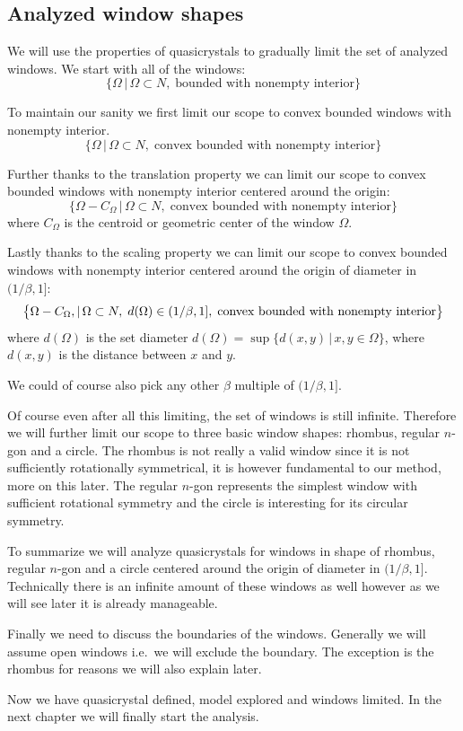 \documentclass[text.tex]{subfiles}
\begin{document}
\subsection{Analyzed window shapes}
We will use the properties of quasicrystals to gradually limit the set of analyzed windows. We start with all of the windows: 
$$\big\{\Omega\,|\, \Omega\subset N ,\;\text{bounded with nonempty interior}\big\}$$

To maintain our sanity we first limit our scope to convex bounded windows with nonempty interior. 
$$\big\{\Omega\,|\, \Omega\subset N ,\;\text{convex bounded with nonempty interior}\big\}$$

Further thanks to the translation property we can limit our scope to convex bounded windows with nonempty interior centered around the origin: 
$$\big\{\Omega-C_\Omega\,|\, \Omega\subset N ,\;\text{convex bounded with nonempty interior}\big\}$$
where $C_\Omega$ is the centroid or geometric center of the window $\Omega$. 

Lastly thanks to the scaling property we can limit our scope to convex bounded windows with nonempty interior centered around the origin of diameter in $(1/\beta,1]$:
$$\big\{\Omega-C_\Omega\\,|\, \Omega\subset N ,\; d(\Omega)\in (1/\beta,1] ,\;\text{convex bounded with nonempty interior}\big\}$$
where $d(\Omega)$ is the set diameter $d(\Omega) = \sup\{d(x,y)\,|\,x,y\in\Omega\}$, where $d(x,y)$ is the distance between $x$ and $y$. 

\begin{remark}
We could of course also pick any other $\beta$ multiple of $(1/\beta,1]$. 
\end{remark}

Of course even after all this limiting, the set of windows is still infinite. Therefore we will further limit our scope to three basic window shapes: rhombus, regular $n$-gon and a circle. The rhombus is not really a valid window since it is not sufficiently rotationally symmetrical, it is however fundamental to our method, more on this later. The regular $n$-gon represents the simplest window with sufficient rotational symmetry and the circle is interesting for its circular symmetry. 

To summarize we will analyze quasicrystals for windows in shape of rhombus, regular $n$-gon and a circle centered around the origin of diameter in $(1/\beta,1]$. Technically there is an infinite amount of these windows as well however as we will see later it is already manageable. 

Finally we need to discuss the boundaries of the windows. Generally we will assume open windows i.e.\ we will exclude the boundary. The exception is the rhombus for reasons we will also explain later. 

Now we have quasicrystal defined, model explored and windows limited. In the next chapter we will finally start the analysis. 
\end{document}
